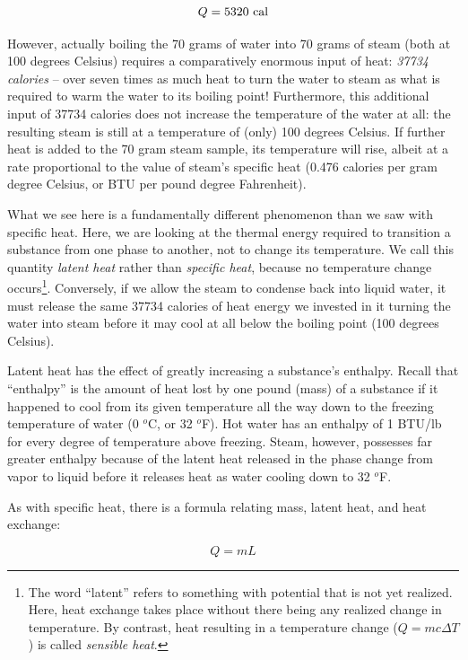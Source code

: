 $$Q = 5320 \hbox{ cal}$$

However, actually boiling the 70 grams of water into 70 grams of steam (both at 100 degrees Celsius) requires a comparatively enormous input of heat: \textit{37734 calories} -- over seven times as much heat to turn the water to steam as what is required to warm the water to its boiling point!  Furthermore, this additional input of 37734 calories does not increase the temperature of the water at all: the resulting steam is still at a temperature of (only) 100 degrees Celsius.  If further heat is added to the 70 gram steam sample, its temperature will rise, albeit at a rate proportional to the value of steam's specific heat (0.476 calories per gram degree Celsius, or BTU per pound degree Fahrenheit).

What we see here is a fundamentally different phenomenon than we saw with specific heat.  Here, we are looking at the thermal energy required to transition a substance from one phase to another, not to change its temperature.  We call this quantity \textit{latent heat} rather than \textit{specific heat}, because no temperature change occurs\footnote{The word ``latent'' refers to something with potential that is not yet realized.  Here, heat exchange takes place without there being any realized change in temperature.  By contrast, heat resulting in a temperature change ($Q = mc \Delta T$) is called \textit{sensible heat}.}.  Conversely, if we allow the steam to condense back into liquid water, it must release the same 37734 calories of heat energy we invested in it turning the water into steam before it may cool at all below the boiling point (100 degrees Celsius).    

Latent heat has the effect of greatly increasing a substance's enthalpy.  Recall that ``enthalpy'' is the amount of heat lost by one pound (mass) of a substance if it happened to cool from its given temperature all the way down to the freezing temperature of water (0 $^{o}$C, or 32 $^{o}$F).  Hot water has an enthalpy of 1 BTU/lb for every degree of temperature above freezing.  Steam, however, possesses far greater enthalpy because of the latent heat released in the phase change from vapor to liquid before it releases heat as water cooling down to 32 $^{o}$F. 

\filbreak

As with specific heat, there is a formula relating mass, latent heat, and heat exchange:

$$Q = mL$$

